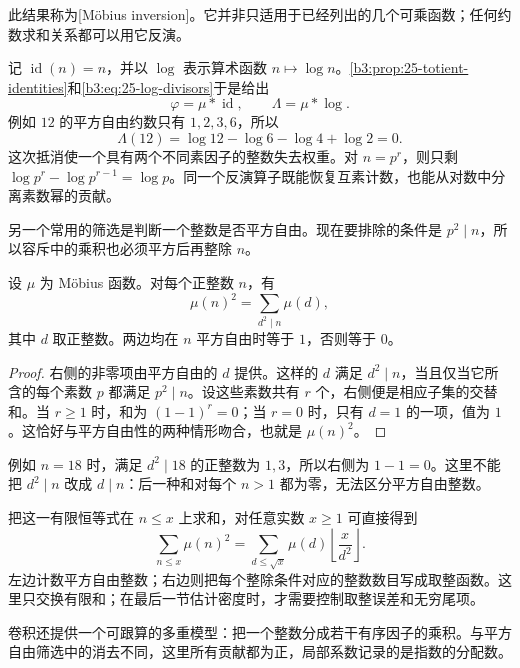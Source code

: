 此结果称为[Möbius inversion]。它并非只适用于已经列出的几个可乘函数；任何约数求和关系都可以用它反演。

记 \(\operatorname{id}(n)=n\)，并以 \(\log\) 表示算术函数 \(n\mapsto\log n\)。\cref{b3:prop:25-totient-identities}和\eqref{b3:eq:25-log-divisors}于是给出
\[
 \varphi=\mu*\operatorname{id},\qquad \Lambda=\mu*\log.
\]
例如 \(12\) 的平方自由约数只有 \(1,2,3,6\)，所以
\[
 \Lambda(12)=\log12-\log6-\log4+\log2=0.
\]
这次抵消使一个具有两个不同素因子的整数失去权重。对 \(n=p^r\)，则只剩 \(\log p^r-\log p^{r-1}=\log p\)。同一个反演算子既能恢复互素计数，也能从对数中分离素数幂的贡献。

\ProseParagraphBreak

另一个常用的筛选是判断一个整数是否平方自由。现在要排除的条件是 \(p^2\mid n\)，所以容斥中的乘积也必须平方后再整除 \(n\)。

\begin{proposition}[平方自由筛选恒等式]
\label{b3:prop:25-squarefree-filter}
设 \(\mu\) 为 Möbius 函数。对每个正整数 \(n\)，有
\[
 \mu(n)^2=\sum_{d^2\mid n}\mu(d),
\]
其中 \(d\) 取正整数。两边均在 \(n\) 平方自由时等于 \(1\)，否则等于 \(0\)。
\end{proposition}
\begin{proof}
右侧的非零项由平方自由的 \(d\) 提供。这样的 \(d\) 满足 \(d^2\mid n\)，当且仅当它所含的每个素数 \(p\) 都满足 \(p^2\mid n\)。设这些素数共有 \(r\) 个，右侧便是相应子集的交替和。当 \(r\ge1\) 时，和为 \((1-1)^r=0\)；当 \(r=0\) 时，只有 \(d=1\) 的一项，值为 \(1\)。这恰好与平方自由性的两种情形吻合，也就是 \(\mu(n)^2\)。
\end{proof}

例如 \(n=18\) 时，满足 \(d^2\mid18\) 的正整数为 \(1,3\)，所以右侧为 \(1-1=0\)。这里不能把 \(d^2\mid n\) 改成 \(d\mid n\)：后一种和对每个 \(n>1\) 都为零，无法区分平方自由整数。

把这一有限恒等式在 \(n\le x\) 上求和，对任意实数 \(x\ge1\) 可直接得到
\[
 \sum_{n\le x}\mu(n)^2
 =\sum_{d\le\sqrt{x}}\mu(d)\left\lfloor\frac{x}{d^2}\right\rfloor.
\]
左边计数平方自由整数；右边则把每个整除条件对应的整数数目写成取整函数。这里只交换有限和；在最后一节估计密度时，才需要控制取整误差和无穷尾项。

\ProseParagraphBreak

卷积还提供一个可跟算的多重模型：把一个整数分成若干有序因子的乘积。与平方自由筛选中的消去不同，这里所有贡献都为正，局部系数记录的是指数的分配数。

